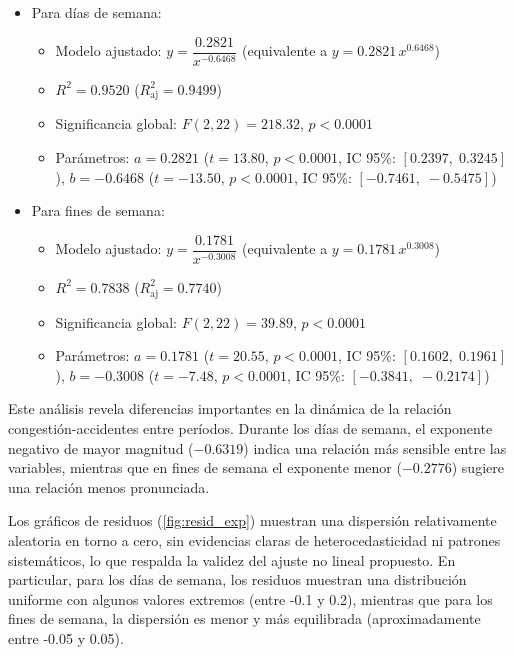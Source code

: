 \documentclass[12pt]{article}
\begin{document}
\begin{itemize}
    \item Para días de semana:
    \begin{itemize}
        \item Modelo ajustado: $y = \dfrac{0.2821}{x^{-0.6468}}$ \; (equivalente a $y = 0.2821\,x^{0.6468}$)
        \item $R^2 = 0.9520$ \; ($R^2_{\text{aj}} = 0.9499$)
        \item Significancia global: $F(2, 22) = 218.32$, $p < 0.0001$
        \item Parámetros:
              $a=0.2821$ \; ($t = 13.80$, $p < 0.0001$, IC 95\%: $[0.2397,\;0.3245]$), \;
              $b=-0.6468$ \; ($t = -13.50$, $p < 0.0001$, IC 95\%: $[-0.7461,\;-0.5475]$)
    \end{itemize}

    \item Para fines de semana:
    \begin{itemize}
        \item Modelo ajustado: $y = \dfrac{0.1781}{x^{-0.3008}}$ \; (equivalente a $y = 0.1781\,x^{0.3008}$)
        \item $R^2 = 0.7838$ \; ($R^2_{\text{aj}} = 0.7740$)
        \item Significancia global: $F(2, 22) = 39.89$, $p < 0.0001$
        \item Parámetros:
              $a=0.1781$ \; ($t = 20.55$, $p < 0.0001$, IC 95\%: $[0.1602,\;0.1961]$), \;
              $b=-0.3008$ \; ($t = -7.48$, $p < 0.0001$, IC 95\%: $[-0.3841,\;-0.2174]$)
    \end{itemize}
\end{itemize}

Este análisis revela diferencias importantes en la dinámica de la relación congestión-accidentes entre períodos. Durante los días de semana, el exponente negativo de mayor magnitud ($-0.6319$) indica una relación más sensible entre las variables, mientras que en fines de semana el exponente menor ($-0.2776$) sugiere una relación menos pronunciada.

Los gráficos de residuos (\autoref{fig:resid_exp}) muestran una dispersión relativamente aleatoria en torno a cero, sin evidencias claras de heterocedasticidad ni patrones sistemáticos, lo que respalda la validez del ajuste no lineal propuesto. En particular, para los días de semana, los residuos muestran una distribución uniforme con algunos valores extremos (entre -0.1 y 0.2), mientras que para los fines de semana, la dispersión es menor y más equilibrada (aproximadamente entre -0.05 y 0.05).
\end{document}
